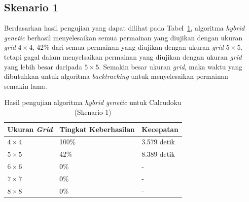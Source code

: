 \subsection{Skenario 1}
\label{sec:skenario1}

Berdasarkan hasil pengujian yang dapat dilihat pada Tabel~\ref{tab:pengujianhg1}, algoritma \textit{hybrid genetic} berhasil menyelesaikan semua permainan yang diujikan dengan ukuran \textit{grid} \begin{math}4 \times 4\end{math}, 42\% dari semua permainan yang diujikan dengan ukuran \textit{grid} \begin{math}5 \times 5\end{math}, tetapi gagal dalam menyelsaikan permainan yang diujikan dengan ukuran \textit{grid} yang lebih besar daripada \begin{math}5 \times 5\end{math}. Semakin besar ukuran \textit{grid}, maka waktu yang dibutuhkan untuk algoritma \textit{backtracking} untuk menyelesaikan permainan semakin lama.

\begin{table}
\centering
\captionsetup{justification=centering}
\caption[Hasil pengujian algoritma \textit{hybrid genetic} untuk Calcudoku (Skenario 1)]{Hasil pengujian algoritma \textit{hybrid genetic} untuk Calcudoku (Skenario 1)}
\begin{tabular}{| l | l | l |}
\hline
Ukuran \textit{Grid} & Tingkat Keberhasilan & Kecepatan \\
\hline \hline
\begin{math}4 \times 4\end{math} & 100\% & 3.579 detik \\
\hline
\begin{math}5 \times 5\end{math} & 42\% & 8.389 detik \\
\hline
\begin{math}6 \times 6\end{math} & 0\% & - \\
\hline
\begin{math}7 \times 7\end{math} & 0\% & - \\
\hline
\begin{math}8 \times 8\end{math} & 0\% & - \\
\hline
\end{tabular}
\label{tab:pengujianhg1}
\end{table}

